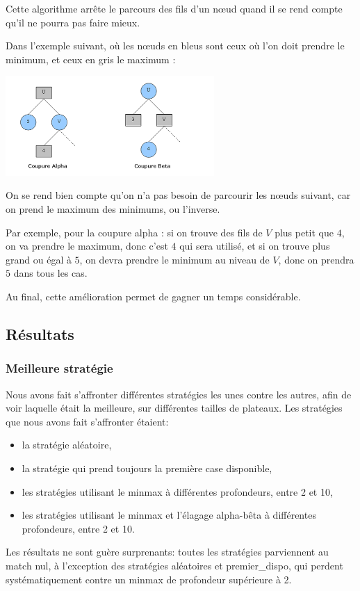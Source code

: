 Cette algorithme arrête le parcours des fils d'un nœud quand il se rend
compte qu'il ne pourra pas faire mieux.

Dans l'exemple suivant, où les nœuds en bleus sont ceux où l'on doit prendre
le minimum, et ceux en gris le maximum :
\begin{center}
  \includegraphics[width=300px]{coupures_alpha-beta.png}
\end{center}

On se rend bien compte qu'on n'a pas besoin de parcourir les nœuds suivant,
car on prend le maximum des minimums, ou l'inverse.

Par exemple, pour la coupure alpha : si on trouve des fils de $V$ plus petit
que $4$, on va prendre le maximum, donc c'est $4$ qui sera utilisé, et si on
trouve plus grand ou égal à $5$, on devra prendre le minimum au niveau de $V$,
donc on prendra $5$ dans tous les cas.

Au final, cette amélioration permet de gagner un temps considérable.

\subsection{Résultats}
\subsubsection{Meilleure stratégie}
Nous avons fait s'affronter différentes stratégies les unes contre les
autres, afin de voir laquelle était la meilleure, sur différentes
tailles de plateaux. Les stratégies que nous avons fait s'affronter
étaient:
\begin{itemize}
  \item la stratégie aléatoire,
  \item la stratégie qui prend toujours la première case disponible,
  \item les stratégies utilisant le minmax à différentes profondeurs,
    entre 2 et 10,
  \item les stratégies utilisant le minmax et l'élagage alpha-bêta à
    différentes profondeurs, entre 2 et 10.
\end{itemize}
Les résultats ne sont guère surprenants: toutes les stratégies
parviennent au match nul, à l'exception des stratégies aléatoires et
premier\_dispo, qui perdent systématiquement contre un minmax de
profondeur supérieure à 2.


